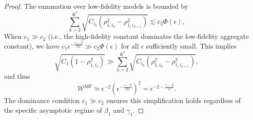 \begin{proof}
%
The summation over low-fidelity models is bounded by
\[
\sum_{k=2}^{K^*} \sqrt{C_{i_k} \left(\rho_{1,i_k}^2 - \rho_{1,i_{k+1}}^2\right)} \lesssim c_2 \Phi(\epsilon),
\]
When $c_1 \gg c_2$ (i.e., the high-fidelity constant dominates the low-fidelity aggregate constant), we have
$c_1 \epsilon^{-\frac{\gamma-\beta}{2\alpha}} \gg c_2 \Phi(\epsilon)$ for all $\epsilon$ sufficiently small. This implies
\[
\sqrt{C_1 \left(1 - \rho_{1,i_2}^2\right)} \gg \sum_{k=2}^{K^*} \sqrt{C_{i_k} \left(\rho_{1,i_k}^2 - \rho_{1,i_{k+1}}^2\right)},
\]
and thus
\[
\mathcal{W}^{\mathrm{MF}} \simeq \epsilon^{-2} \left( \epsilon^{-\frac{\gamma-\beta}{2\alpha}} \right)^2 = \epsilon^{-2 - \frac{\gamma-\beta}{\alpha}}.
\]
The dominance condition $c_1 \gg c_2$ ensures this simplification holds regardless of the specific asymptotic regime of $\beta_1$ and $\gamma_1$.

\end{proof}










